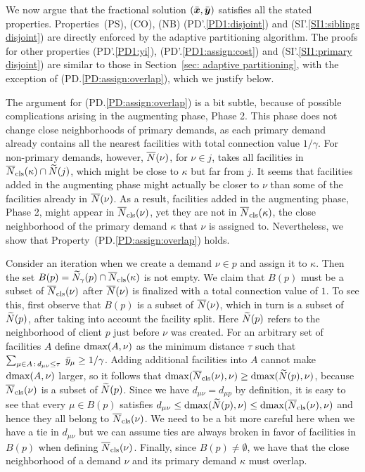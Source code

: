 \documentclass{llncs}
\begin{document}
\smallskip

We now argue that the fractional solution $(\bar{\boldsymbol{x}},\bar{\boldsymbol{y}})$
satisfies all the stated properties. Properties~(PS), (CO), (NB)
(PD'.\ref{PD1:disjoint}) and (SI'.\ref{SI1:siblings disjoint}) are
directly enforced by the adaptive partitioning algorithm. The proofs
for other properties (PD'.\ref{PD1:yi}), (PD'.\ref{PD1:assign:cost})
and (SI'.\ref{SI1:primary disjoint}) are similar to those in
Section~\ref{sec: adaptive partitioning}, with the exception of
(PD.\ref{PD:assign:overlap}), which we justify below.

The argument for (PD.\ref{PD:assign:overlap}) is a bit subtle, because
of possible complications arising in the augmenting phase, Phase 2.
This phase does not change close neighborhoods of primary demands, as
each primary demand already contains all the nearest facilities with
total connection value $1/\gamma$.  For non-primary demands, however,
${\overline{N}}(\nu)$, for $\nu\in j$, takes all facilities in
${\overline{N}}_{\text{cls}}(\kappa)\cap {\widetilde N}(j)$, which might be close to $\kappa$
but far from $j$.  It seems that facilities added in the augmenting
phase might actually be closer to $\nu$ than some of the facilities
already in ${\overline{N}}(\nu)$. As a result, facilities added in the
augmenting phase, Phase 2, might appear in ${\overline{N}}_{\text{cls}}(\nu)$, yet they
are not in ${\overline{N}}_{\text{cls}}(\kappa)$, the close neighborhood of the primary
demand $\kappa$ that $\nu$ is assigned to.  Nevertheless, we show that
Property~(PD.\ref{PD:assign:overlap}) holds.

Consider an iteration when we create a demand $\nu\in p$
and assign it to $\kappa$. Then the set
$B(p)={\widetilde N}_{\gamma}(p)\cap {\overline{N}}_{\text{cls}}(\kappa)$ is not empty.
We claim that
$B(p)$ must be a subset of ${\overline{N}}_{\text{cls}}(\nu)$ after ${\overline{N}}(\nu)$ is
finalized with a total connection value of $1$. To see this, first
observe that $B(p)$ is a subset of ${\overline{N}}(\nu)$, which in turn is a
subset of ${\widetilde N}(p)$, after taking into account the facility
split. Here ${\widetilde N}(p)$ refers to the neighborhood of client $p$
just before $\nu$ was created. For an arbitrary set of facilities
$A$ define $\text{dmax}(A, \nu)$ as the minimum distance $\tau$ such
that $\sum_{\mu\in A {\,:\,} d_{\mu\nu} \leq \tau}\;{\bar y}_{\mu} \geq
1/\gamma$.
Adding additional facilities into $A$ cannot make
$\text{dmax}(A, \nu)$ larger, so it follows that $\text{dmax}({\overline{N}}_{\text{cls}}(\nu), \nu)
\geq \text{dmax}({\widetilde N}(p), \nu)$, because ${\overline{N}}_{\text{cls}}(\nu)$ is a subset of
${\widetilde N}(p)$. Since we have $d_{\mu \nu} = d_{\mu p}$ by definition,
it is easy to see that every $\mu \in B(p)$ satisfies $d_{\mu \nu}
\leq \text{dmax}({\widetilde N}(p), \nu) \leq \text{dmax}({\overline{N}}_{\text{cls}}(\nu), \nu)$ and
hence they all belong to ${\overline{N}}_{\text{cls}}(\nu)$. We need to be a bit more
careful here when we have a tie in $d_{\mu\nu}$ but we can assume ties
are always broken in favor of facilities in $B(p)$ when defining
${\overline{N}}_{\text{cls}}(\nu)$. Finally, since $B(p)\neq\emptyset$, we have that the
close neighborhood of a demand $\nu$ and its primary demand $\kappa$
must overlap.
\end{document}
